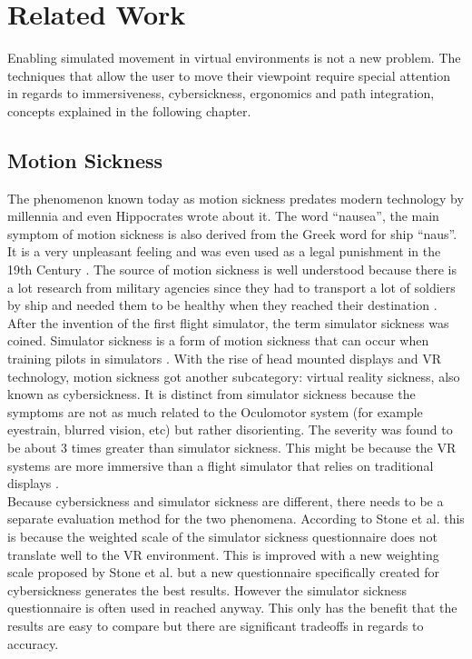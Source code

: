\chapter{Related Work}
Enabling simulated movement in virtual environments is not a new problem. 
The techniques that allow the user to move their viewpoint require special attention in regards to immersiveness, cybersickness, ergonomics and path integration, concepts explained in the following chapter.



\section{Motion Sickness}\label{motion-sickness}

The phenomenon known today as motion sickness predates modern technology
by millennia and even Hippocrates wrote about it. The word ``nausea'',
the main symptom of motion sickness is also derived from the Greek word
for ship ``naus''. \cite{Golding} It is a very
unpleasant feeling and was even used as a legal punishment in the 19th
Century \cite{Reason}. The source of motion sickness is
well understood because there is a lot research from military agencies
since they had to transport a lot of soldiers by ship and needed them to
be healthy when they reached their destination
\cite{Johnson}. After the invention of the first flight
simulator, the term simulator sickness was coined. Simulator sickness is
a form of motion sickness that can occur when training pilots in
simulators \cite{Johnson}. With the rise of head mounted
displays and VR technology, motion sickness got another subcategory:
virtual reality sickness, also known as cybersickness. It is distinct
from simulator sickness because the symptoms are not as much related to
the Oculomotor system (for example eyestrain, blurred vision, etc) but
rather disorienting. The severity was found to be about 3 times greater
than simulator sickness. This might be because the VR systems are more
immersive than a flight simulator that relies on traditional displays
\cite{Stanney}.\\Because cybersickness and simulator
sickness are different, there needs to be a separate evaluation method
for the two phenomena. According to Stone et al. \cite{Stone} this is because the
weighted scale of the simulator sickness questionnaire does not
translate well to the VR environment. This is improved with a new
weighting scale proposed by Stone et al. \cite{Stone} but a new questionnaire
specifically created for cybersickness generates the best results.
However the simulator sickness questionnaire is often used in reached
anyway. This only has the benefit that the results are easy to compare
but there are significant tradeoffs in regards to accuracy.

